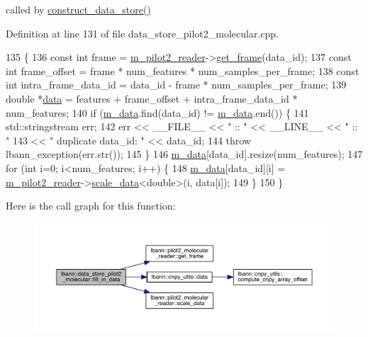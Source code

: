 called by \hyperlink{classlbann_1_1data__store__pilot2__molecular_a8021fa0a93e39c9d43de6ecc2d72e14e}{construct\+\_\+data\+\_\+store()} 



Definition at line 131 of file data\+\_\+store\+\_\+pilot2\+\_\+molecular.\+cpp.


\begin{DoxyCode}
135                       \{
136   \textcolor{keyword}{const} \textcolor{keywordtype}{int} frame = \hyperlink{classlbann_1_1data__store__pilot2__molecular_a1875ae12fe7c2b11818ddb3fecff9f72}{m\_pilot2\_reader}->\hyperlink{classlbann_1_1pilot2__molecular__reader_ac95223a0829a83a5d400c4d66efdcb93}{get\_frame}(data\_id);
137   \textcolor{keyword}{const} \textcolor{keywordtype}{int} frame\_offset = frame * num\_features * num\_samples\_per\_frame;
138   \textcolor{keyword}{const} \textcolor{keywordtype}{int} intra\_frame\_data\_id = data\_id - frame * num\_samples\_per\_frame;
139   \textcolor{keywordtype}{double} *\hyperlink{namespacelbann_1_1cnpy__utils_a9ac86d96ccb1f8b4b2ea16441738781f}{data} = features + frame\_offset + intra\_frame\_data\_id * num\_features;
140   \textcolor{keywordflow}{if} (\hyperlink{classlbann_1_1data__store__pilot2__molecular_afbb012980857b9841deefb055905e6f5}{m\_data}.find(data\_id) != \hyperlink{classlbann_1_1data__store__pilot2__molecular_afbb012980857b9841deefb055905e6f5}{m\_data}.end()) \{
141     std::stringstream err;
142     err << \_\_FILE\_\_  << \textcolor{stringliteral}{" :: "} << \_\_LINE\_\_ << \textcolor{stringliteral}{" :: "}
143         << \textcolor{stringliteral}{" duplicate data\_id: "} << data\_id;
144     \textcolor{keywordflow}{throw} lbann\_exception(err.str());
145   \}
146   \hyperlink{classlbann_1_1data__store__pilot2__molecular_afbb012980857b9841deefb055905e6f5}{m\_data}[data\_id].resize(num\_features);
147   \textcolor{keywordflow}{for} (\textcolor{keywordtype}{int} i=0; i<num\_features; i++) \{
148     \hyperlink{classlbann_1_1data__store__pilot2__molecular_afbb012980857b9841deefb055905e6f5}{m\_data}[data\_id][i] = \hyperlink{classlbann_1_1data__store__pilot2__molecular_a1875ae12fe7c2b11818ddb3fecff9f72}{m\_pilot2\_reader}->\hyperlink{classlbann_1_1pilot2__molecular__reader_add998998fa16444e4509b08f79b291da}{scale\_data}<\textcolor{keywordtype}{double}>(i, data[i]);
149   \}
150 \}
\end{DoxyCode}
Here is the call graph for this function\+:\nopagebreak
\begin{figure}[H]
\begin{center}
\leavevmode
\includegraphics[width=350pt]{classlbann_1_1data__store__pilot2__molecular_a0157fe4d04961c03c0d983cb43aa1cec_cgraph}
\end{center}
\end{figure}
